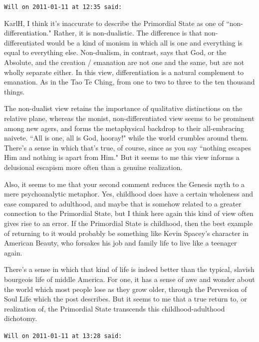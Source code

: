 \begin{footnotesize}\begin{sffamily}


\texttt{Will on 2011-01-11 at 12:35 said: }

KarlH, I think it's inaccurate to describe the Primordial State as one of ``non-differentiation." Rather, it is non-dualistic. The difference is that non-differentiated would be a kind of monism in which all is one and everything is equal to everything else. Non-dualism, in contrast, says that God, or the Absolute, and the creation / emanation are not one and the same, but are not wholly separate either. In this view, differentiation is a natural complement to emanation. As in the Tao Te Ching, from one to two to three to the ten thousand things.

The non-dualist view retains the importance of qualitative distinctions on the relative plane, whereas the monist, non-differentiated view seems to be prominent among new agers, and forms the metaphysical backdrop to their all-embracing naivete. ``All is one, all is God, hooray!" while the world crumbles around them. There's a sense in which that's true, of course, since as you say ``nothing escapes Him and nothing is apart from Him." But it seems to me this view informs a delusional escapism more often than a genuine realization.

Also, it seems to me that your second comment reduces the Genesis myth to a mere psychoanalytic metaphor. Yes, childhood does have a certain wholeness and ease compared to adulthood, and maybe that is somehow related to a greater connection to the Primordial State, but I think here again this kind of view often gives rise to an error. If the Primordial State is childhood, then the best example of returning to it would probably be something like Kevin Spacey's character in American Beauty, who forsakes his job and family life to live like a teenager again.

There's a sense in which that kind of life is indeed better than the typical, slavish bourgeois life of middle America. For one, it has a sense of awe and wonder about the world which most people lose as they grow older, through the Perversion of Soul Life which the post describes. But it seems to me that a true return to, or realization of, the Primordial State transcends this childhood-adulthood dichotomy.


\hfill

\texttt{Will on 2011-01-11 at 13:28 said: }


\end{sffamily}
\end{footnotesize}
